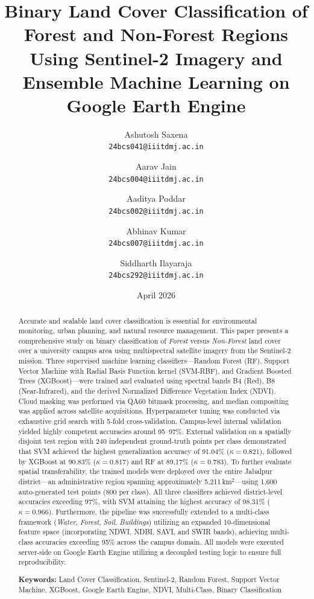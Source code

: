 \documentclass[12pt, a4paper, twocolumn]{article}
\title{
    \vspace{-1cm}
    \textbf{\Large Binary Land Cover Classification of Forest and Non-Forest Regions Using Sentinel-2 Imagery and Ensemble Machine Learning on Google Earth Engine}
    \vspace{0.3cm}
}
\author{
    Ashutosh Saxena \\ \small\texttt{24bcs041@iiitdmj.ac.in} \and 
    Aarav Jain \\ \small\texttt{24bcs004@iiitdmj.ac.in} \and 
    Aaditya Poddar \\ \small\texttt{24bcs002@iiitdmj.ac.in} \and 
    Abhinav Kumar \\ \small\texttt{24bcs007@iiitdmj.ac.in} \and 
    Siddharth Ilayaraja \\ \small\texttt{24bcs292@iiitdmj.ac.in}
}
\date{April 2026}
\begin{document}
\onecolumn
\maketitle
\begin{abstract}
\noindent
Accurate and scalable land cover classification is essential for environmental monitoring, urban planning, and natural resource management. This paper presents a comprehensive study on binary classification of \textit{Forest} versus \textit{Non-Forest} land cover over a university campus area using multispectral satellite imagery from the Sentinel-2 mission. Three supervised machine learning classifiers---Random Forest (RF), Support Vector Machine with Radial Basis Function kernel (SVM-RBF), and Gradient Boosted Trees (XGBoost)---were trained and evaluated using spectral bands B4 (Red), B8 (Near-Infrared), and the derived Normalized Difference Vegetation Index (NDVI). Cloud masking was performed via QA60 bitmask processing, and median compositing was applied across satellite acquisitions. Hyperparameter tuning was conducted via exhaustive grid search with 5-fold cross-validation. Campus-level internal validation yielded highly competent accuracies around 95--97\%. External validation on a spatially disjoint test region with 240 independent ground-truth points per class demonstrated that SVM achieved the highest generalization accuracy of 91.04\% ($\kappa = 0.821$), followed by XGBoost at 90.83\% ($\kappa = 0.817$) and RF at 89.17\% ($\kappa = 0.783$). To further evaluate spatial transferability, the trained models were deployed over the entire Jabalpur district---an administrative region spanning approximately 5,211\,km$^2$---using 1,600 auto-generated test points (800 per class). All three classifiers achieved district-level accuracies exceeding 97\%, with SVM attaining the highest accuracy of 98.31\% ($\kappa = 0.966$). Furthermore, the pipeline was successfully extended to a multi-class framework (\textit{Water}, \textit{Forest}, \textit{Soil}, \textit{Buildings}) utilizing an expanded 10-dimensional feature space (incorporating NDWI, NDBI, SAVI, and SWIR bands), achieving multi-class accuracies exceeding 95\% across the campus domain. All models were executed server-side on Google Earth Engine utilizing a decoupled testing logic to ensure full reproducibility.

\vspace{0.3cm}
\noindent\textbf{Keywords:} Land Cover Classification, Sentinel-2, Random Forest, Support Vector Machine, XGBoost, Google Earth Engine, NDVI, Multi-Class, Binary Classification
\end{abstract}
\end{document}
